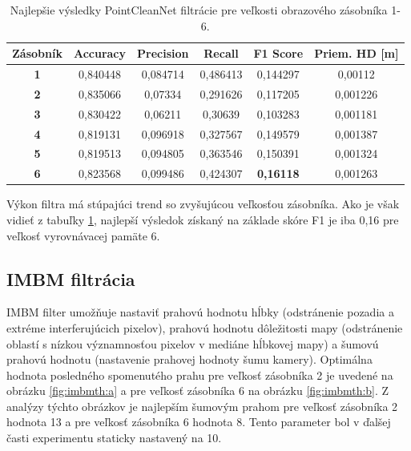 \begin{table}[h]
	\caption{\label{tab:pcn_best} Najlepšie výsledky PointCleanNet filtrácie pre veľkosti obrazového zásobníka 1-6.}
	\centering
	\begin{tabular}{cccccc}
		\toprule
		\textbf{Zásobník} & \textbf{Accuracy} & \textbf{Precision} & \textbf{Recall} & \textbf{F1 Score} & \textbf{Priem. HD [m]} \\ 
		\midrule
		\textbf{1}           & 0,840448          & 0,084714           & 0,486413        & 0,144297          & 0,00112                         \\ 
		\textbf{2}           & 0,835066          & 0,07334            & 0,291626        & 0,117205          & 0,001226                        \\ 
		\textbf{3}           & 0,830422          & 0,06211            & 0,30639         & 0,103283          & 0,001181                        \\ 
		\textbf{4}           & 0,819131          & 0,096918           & 0,327567        & 0,149579          & 0,001387                        \\ 
		\textbf{5}           & 0,819513          & 0,094805           & 0,363546        & 0,150391          & 0,001324                        \\ 
		\textbf{6}           & 0,823568          & 0,099486           & 0,424307        & \textbf{0,16118}           & 0,001263                        \\ 
		\bottomrule
	\end{tabular}
\end{table}

Výkon filtra má stúpajúci trend so zvyšujúcou veľkosťou zásobníka. Ako je však vidieť z tabuľky \ref{tab:pcn_best}, najlepší výsledok získaný na základe skóre F1 je iba 0,16 pre veľkosť vyrovnávacej pamäte 6.

\subsection{IMBM filtrácia}
\label{sec:imbm:filtration}

IMBM filter umožňuje nastaviť prahovú hodnotu hĺbky (odstránenie pozadia a extréme interferujúcich pixelov), prahovú hodnotu dôležitosti mapy (odstránenie oblastí s nízkou významnosťou pixelov v mediáne hĺbkovej mapy) a šumovú prahovú hodnotu (nastavenie prahovej hodnoty šumu kamery). Optimálna hodnota posledného spomenutého prahu pre veľkosť zásobníka 2 je uvedené na obrázku \ref{fig:imbmth:a} a pre veľkosť zásobníka 6 na obrázku \ref {fig:imbmth:b}. Z analýzy týchto obrázkov je najlepším šumovým prahom pre veľkosť zásobníka 2 hodnota 13 a pre veľkosť zásobníka 6 hodnota 8. Tento parameter bol v ďalšej časti experimentu staticky nastavený na 10.


